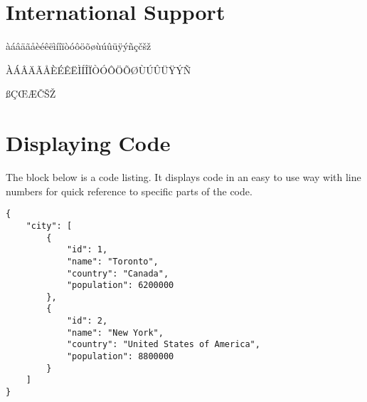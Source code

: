 \documentclass[
	a4paper, %
	12pt, %
]{CSSullivanBusinessReport}
\begin{document}

\section{International Support}

àáâäãåèéêëìíîïòóôöõøùúûüÿýñçčšž

ÀÁÂÄÃÅÈÉÊËÌÍÎÏÒÓÔÖÕØÙÚÛÜŸÝÑ

ßÇŒÆČŠŽ


\section{Displaying Code}

The block below is a code listing. It displays code in an easy to use way with line numbers for quick reference to specific parts of the code.

\begin{lstlisting}
{
	"city": [
		{
			"id": 1,
			"name": "Toronto",
			"country": "Canada",
			"population": 6200000
		},
		{
			"id": 2,
			"name": "New York",
			"country": "United States of America",
			"population": 8800000
		}
	]
}
\end{lstlisting}


\newpage


\begin{twothirdswidth} %
	\printbibliography[title=Reference List] %
\end{twothirdswidth}

\end{document}

